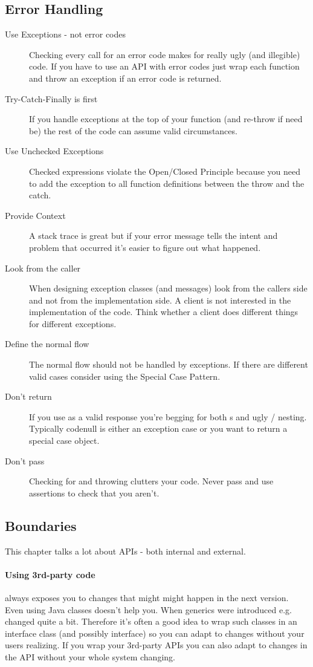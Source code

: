 \documentclass[a4paper, twocolumn]{article}
\newcommand{\code}[1]{\texttt{\color{black}{#1}}}
\begin{document}
\subsection{Error Handling}
\begin{description}
	\item[Use Exceptions - not error codes] Checking every call for an error code makes for really ugly (and illegible) code. If you have to use an API with error codes just wrap each function and throw an exception if an error code is returned.
	\item[Try-Catch-Finally is first] If you handle exceptions at the top of your function (and re-throw if need be) the rest of the code can assume valid circumstances.
	\item[Use Unchecked Exceptions] Checked expressions violate the Open/Closed Principle because you need to add the exception to all function definitions between the throw and the catch.
	\item[Provide Context] A stack trace is great but if your error message tells the intent and problem that occurred it's easier to figure out what happened.
	\item[Look from the caller] When designing exception classes (and messages) look from the callers side and not from the implementation side. A client is not interested in the implementation of the code. Think whether a client does different things for different exceptions.
	\item[Define the normal flow] The normal flow should not be handled by exceptions. If there are different valid cases consider using the Special Case Pattern.
	\item[Don't return \code{null}] If you use \code{null} as a valid response you're begging for both \code{NullPointerException}s and ugly \code{if}/\code{else} nesting. Typically code{null} is either an exception case or you want to return a special case object.
	\item[Don't pass \code{null}] Checking for \code{null} and throwing \code{InvalidArgumentExceptions} clutters your code. Never pass \code{null} and use assertions to check that you aren't.
\end{description}

\subsection{Boundaries}
This chapter talks a lot about APIs - both internal and external.
\paragraph{Using 3rd-party code} always exposes you to changes that might might happen in the next version. Even using Java classes doesn't help you. When generics were introduced e.g. \code{Map} changed quite a bit.
Therefore it's often a good idea to wrap such classes in an interface class (and possibly interface) so you can adapt to changes without your users realizing. If you wrap your 3rd-party APIs you can also adapt to changes in the API without your whole system changing.
\end{document}
